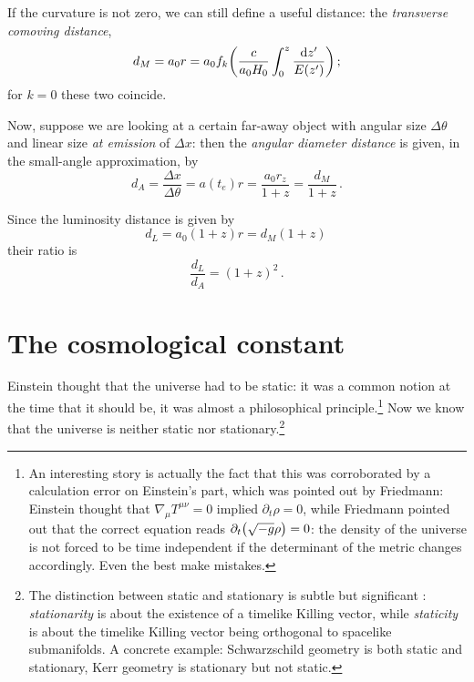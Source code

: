 \documentclass[main.tex]{subfiles}
\begin{document}
If the curvature is not zero, we can still define a useful distance: the \emph{transverse comoving distance}, 
%
\begin{align}
d_M = a_0 r = a_0 f_k \qty(\frac{c}{a_0 H_0 } \int_0^z \frac{\dd{z'}   }{E(z')})
\,;
\end{align}
%
for \(k=0\) these two coincide.



Now,  suppose we are looking at a certain far-away object with angular size \(\Delta \theta \) and linear size \emph{at emission} of \(\Delta x\): then the \emph{angular diameter distance} is given, in the small-angle approximation, by
%
\begin{equation}
d_A = \frac{ \Delta x}{\Delta \theta } = a(t_e) r
= \frac{a_0 r_z}{1+z} = \frac{d_M}{1+z}
\,.
\end{equation}

Since the luminosity distance is given by 
%
\begin{equation}
 d_L = a_0 (1+z) r = d_M (1+z)
\,
\end{equation}
%
their ratio is  
%
\begin{equation}
  \frac{d_L}{d_A} = (1+z)^2
\,.
\end{equation}



\section{The cosmological constant}

Einstein thought that the universe had to be static: it was a common notion at the time that it should be, it was almost a philosophical principle.\footnote{An interesting story is actually the fact that this was corroborated by a calculation error on Einstein's part, which was pointed out by Friedmann: Einstein thought \cite{einsteinCommentFriedmannPaper1922} that \(\nabla_{\mu } T^{\mu \nu }= 0\) implied \(\partial_{t} \rho =0\), while Friedmann pointed out \cite{friedmannAlexanderFriedmann1922} that the correct equation reads \( \partial_{t} \qty(\sqrt{-g} \rho ) =0\): the density of the universe is not forced to be time independent if the determinant of the metric changes accordingly. Even the best make mistakes.}
Now we know that the universe is neither static nor stationary.\footnote{The distinction between static and stationary is subtle but significant \cite{ludvigsenGeneralRelativityGeometric1999}: \emph{stationarity} is about the existence of a timelike Killing vector, while \emph{staticity} is about the timelike Killing vector being orthogonal to spacelike submanifolds. 
A concrete example: Schwarzschild geometry is both static and stationary, Kerr geometry is stationary but not static.}
\end{document}
